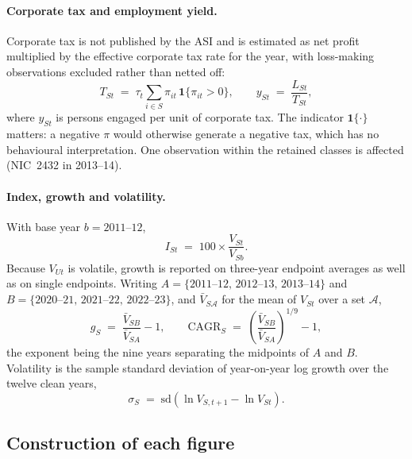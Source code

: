 \documentclass[11pt, a4paper]{article}
\numberwithin{figure}{section}
\numberwithin{table}{section}
\begin{document}
\paragraph{Corporate tax and employment yield.} Corporate tax is not published by
the ASI and is estimated as net profit multiplied by the effective corporate tax
rate for the year, with loss-making observations excluded rather than netted off:
\begin{equation}
    T_{St} \;=\; \tau_t \sum_{i \in S} \pi_{it}\,\mathbf{1}\{\pi_{it} > 0\},
    \qquad
    y_{St} \;=\; \frac{L_{St}}{T_{St}} ,
    \label{eq:tax}
\end{equation}
where $y_{St}$ is persons engaged per unit of corporate tax. The indicator
$\mathbf{1}\{\cdot\}$ matters: a negative $\pi$ would otherwise generate a negative
tax, which has no behavioural interpretation. One observation within the retained
classes is affected (NIC~2432 in 2013--14).

\paragraph{Index, growth and volatility.} With base year $b = 2011\text{--}12$,
\begin{equation}
    I_{St} \;=\; 100 \times \frac{V_{St}}{V_{Sb}} .
    \label{eq:index}
\end{equation}
Because $V_{Ut}$ is volatile, growth is reported on three-year endpoint averages
as well as on single endpoints. Writing $A = \{2011\text{--}12,\,2012\text{--}13,\,2013\text{--}14\}$
and $B = \{2020\text{--}21,\,2021\text{--}22,\,2022\text{--}23\}$, and $\bar V_{S\mathcal{A}}$
for the mean of $V_{St}$ over a set $\mathcal{A}$,
\begin{equation}
    g_S \;=\; \frac{\bar V_{SB}}{\bar V_{SA}} - 1,
    \qquad
    \mathrm{CAGR}_S \;=\; \left( \frac{\bar V_{SB}}{\bar V_{SA}} \right)^{1/9} - 1 ,
    \label{eq:growth}
\end{equation}
the exponent being the nine years separating the midpoints of $A$ and $B$.
Volatility is the sample standard deviation of year-on-year log growth over the
twelve clean years,
\begin{equation}
    \sigma_S \;=\; \mathrm{sd}\!\left( \ln V_{S,t+1} - \ln V_{St} \right) .
    \label{eq:vol}
\end{equation}

\subsection{Construction of each figure}
\label{app:asi_figures}
\end{document}
